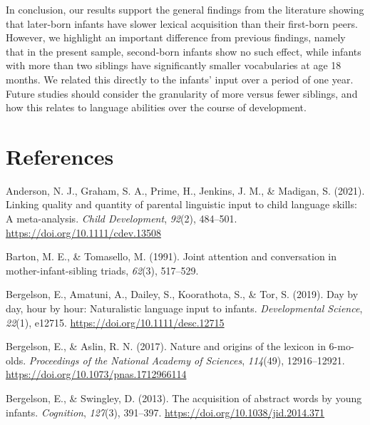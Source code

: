 \documentclass[
  english,
  man,floatsintext]{apa6}
\begin{document}
In conclusion, our results support the general findings from the literature showing that later-born infants have slower lexical acquisition than their first-born peers. However, we highlight an important difference from previous findings, namely that in the present sample, second-born infants show no such effect, while infants with more than two siblings have significantly smaller vocabularies at age 18 months. We related this directly to the infants' input over a period of one year. Future studies should consider the granularity of more versus fewer siblings, and how this relates to language abilities over the course of development.

\newpage

\hypertarget{references}{%
\section{References}\label{references}}

\begingroup
\setlength{\parindent}{-0.5in}
\setlength{\leftskip}{0.5in}

\hypertarget{refs}{}
\leavevmode\hypertarget{ref-anderson_linking_2021}{}%
Anderson, N. J., Graham, S. A., Prime, H., Jenkins, J. M., \& Madigan, S. (2021). Linking quality and quantity of parental linguistic input to child language skills: A meta-analysis. \emph{Child Development}, \emph{92}(2), 484--501. \url{https://doi.org/10.1111/cdev.13508}

\leavevmode\hypertarget{ref-barton_joint_1991}{}%
Barton, M. E., \& Tomasello, M. (1991). Joint attention and conversation in mother-infant-sibling triads, \emph{62}(3), 517--529.

\leavevmode\hypertarget{ref-bergelson_day_2019}{}%
Bergelson, E., Amatuni, A., Dailey, S., Koorathota, S., \& Tor, S. (2019). Day by day, hour by hour: Naturalistic language input to infants. \emph{Developmental Science}, \emph{22}(1), e12715. \url{https://doi.org/10.1111/desc.12715}

\leavevmode\hypertarget{ref-bergelson_nature_2017}{}%
Bergelson, E., \& Aslin, R. N. (2017). Nature and origins of the lexicon in 6-mo-olds. \emph{Proceedings of the National Academy of Sciences}, \emph{114}(49), 12916--12921. \url{https://doi.org/10.1073/pnas.1712966114}

\leavevmode\hypertarget{ref-bergelson_acquisition_2013}{}%
Bergelson, E., \& Swingley, D. (2013). The acquisition of abstract words by young infants. \emph{Cognition}, \emph{127}(3), 391--397. \url{https://doi.org/10.1038/jid.2014.371}
\end{document}

